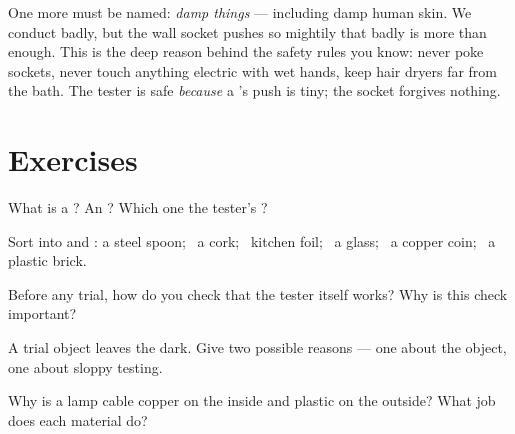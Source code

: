 \begin{remark}\label{rem:g4:conductors-insulators:safety}
One more  must be named: \emph{damp
things} --- including damp human skin. We conduct badly, but the
wall socket pushes so mightily that badly is more than enough. This
is the deep reason behind the safety rules you know: never poke
sockets, never touch anything electric with wet hands, keep hair
dryers far from the bath. The  tester is safe \emph{because}
a 's push is tiny; the socket forgives nothing.
\end{remark}

\section{Exercises}

\begin{exercise}[$\star$]\label{exo:g4:conductors-insulators:1}
What is a ? An ? Which one  the tester's
?
\end{exercise}

\begin{exercise}[$\star$]\label{exo:g4:conductors-insulators:2}
Sort into  and : a steel spoon; \ a cork; \ kitchen foil; \
a glass; \ a copper coin; \ a plastic brick.
\end{exercise}

\begin{exercise}[$\star$]\label{exo:g4:conductors-insulators:3}
Before any trial, how do you check that the tester itself works?
Why is this check important?
\end{exercise}

\begin{exercise}[$\star$]\label{exo:g4:conductors-insulators:4}
A trial object leaves the  dark. Give two possible reasons ---
one about the object, one about sloppy testing.
\end{exercise}

\begin{exercise}[$\star$]\label{exo:g4:conductors-insulators:5}
Why is a lamp cable copper on the inside and plastic on the
outside? What job does each material do?
\end{exercise}

